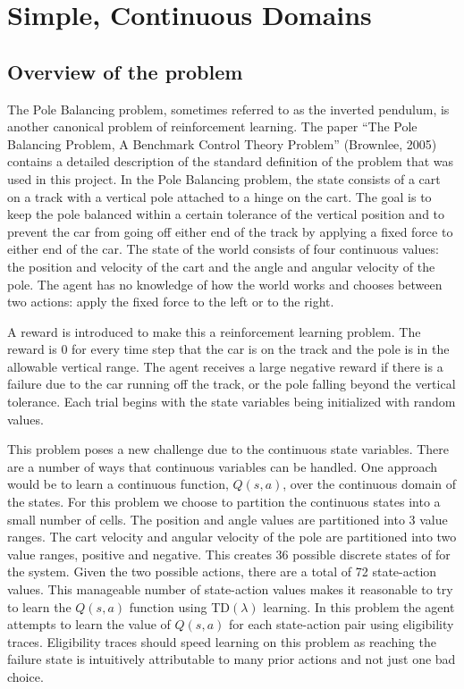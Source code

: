 \section{Simple, Continuous Domains}
\subsection{Overview of the problem}
The Pole Balancing problem, sometimes referred to as the inverted pendulum, is another canonical problem of reinforcement learning.  The paper “The Pole Balancing Problem, A Benchmark Control Theory Problem” (Brownlee, 2005) contains a detailed description of the standard definition of the problem that was used in this project.  In the Pole Balancing problem, the state consists of a cart on a track with a vertical pole attached to a hinge on the cart.  The goal is to keep the pole balanced within a certain tolerance of the vertical position and to prevent the car from going off either end of the track by applying a fixed force to either end of the car.  The state of the world consists of four continuous values: the position and velocity of the cart and the angle and angular velocity of the pole.  The agent has no knowledge of how the world works and chooses between two actions: apply the fixed force to the left or to the right.

A reward is introduced to make this a reinforcement learning problem.  The reward is 0 for every time step that the car is on the track and the pole is in the allowable vertical range.  The agent receives a large negative reward if there is a failure due to the car running off the track, or the pole falling beyond the vertical tolerance.  Each trial begins with the state variables being initialized with random values.

This problem poses a new challenge due to the continuous state variables.  There are a number of ways that continuous variables can be handled.  One approach would be to learn a continuous function, $Q(s,a)$, over the continuous domain of the states.  For this problem we choose to partition the continuous states into a small number of cells.  The position and angle values are partitioned into 3 value ranges.  The cart velocity and angular velocity of the pole are partitioned into two value ranges, positive and negative.  This creates 36 possible discrete states of for the system.  Given the two possible actions, there are a total of 72 state-action values.  This manageable number of state-action values makes it reasonable to try to learn the $Q(s,a)$ function using TD$(\lambda)$ learning.  In this problem the agent attempts to learn the value of $Q(s,a)$ for each state-action pair using eligibility traces.  Eligibility traces should speed learning on this problem as reaching the failure state is intuitively attributable to many prior actions and not just one bad choice.


